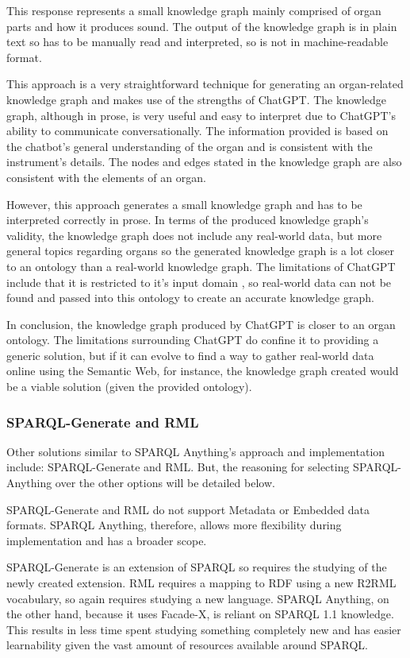 This response represents a small knowledge graph mainly comprised of organ parts and how it produces sound. The output of the knowledge graph is in plain text so has to be manually read and interpreted, so is not in machine-readable format. 

This approach is a very straightforward technique for generating an organ-related knowledge graph and makes use of the strengths of ChatGPT. The knowledge graph, although in prose, is very useful and easy to interpret due to ChatGPT's ability to communicate conversationally. The information provided is based on the chatbot's general understanding of the organ and is consistent with the instrument's details. The nodes and edges stated in the knowledge graph are also consistent with the elements of an organ. 

However, this approach generates a small knowledge graph and has to be interpreted correctly in prose. In terms of the produced knowledge graph's validity, the knowledge graph does not include any real-world data, but more general topics regarding organs so the generated knowledge graph is a lot closer to an ontology than a real-world knowledge graph. The limitations of ChatGPT include that it is restricted to it's input domain \cite{chatgptwebsite}, so real-world data can not be found and passed into this ontology to create an accurate knowledge graph. 

In conclusion, the knowledge graph produced by ChatGPT is closer to an organ ontology. The limitations surrounding ChatGPT do confine it to providing a generic solution, but if it can evolve to find a way to gather real-world data online using the Semantic Web, for instance, the knowledge graph created would be a viable solution (given the provided ontology).

\subsubsection{SPARQL-Generate and RML}
\hspace{0.5cm} Other solutions similar to SPARQL Anything's approach and implementation include: SPARQL-Generate and RML. But, the reasoning for selecting SPARQL-Anything over the other options will be detailed below.

SPARQL-Generate and RML do not support Metadata or Embedded data formats. \cite{sparqlanything} SPARQL Anything, therefore, allows more flexibility during implementation and has a broader scope. 

SPARQL-Generate is an extension of SPARQL so requires the studying of the newly created extension. RML requires a mapping to RDF using a new R2RML vocabulary, so again requires studying a new language. SPARQL Anything, on the other hand, because it uses Facade-X, is reliant on SPARQL 1.1 knowledge. \cite{sparqlanything} This results in less time spent studying something completely new and has easier learnability given the vast amount of resources available around SPARQL.

